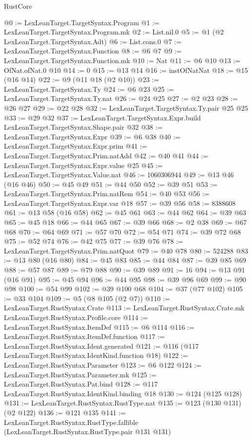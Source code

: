 \begin{lexlean}{RustCore}
\begin{coremodule}
@0 := LexLeanTarget.TargetSyntax.Program
@1 := LexLeanTarget.TargetSyntax.Program.mk
@2 := List.nil.{0}
@5 := @1 (@2 LexLeanTarget.TargetSyntax.Adt)
@6 := List.cons.{0}
@7 := LexLeanTarget.TargetSyntax.Function
@8 := @6 @7
@9 := LexLeanTarget.TargetSyntax.Function.mk
@10 := Nat
@11 := @6 @10
@13 := OfNat.ofNat.{0} @10
@14 := 0
@15 := @13 @14
@16 := instOfNatNat
@18 := @15 (@16 @14)
@22 := @9 (@11 @18 (@2 @10))
@23 := LexLeanTarget.TargetSyntax.Ty
@24 := @6 @23
@25 := LexLeanTarget.TargetSyntax.Ty.nat
@26 := @24 @25
@27 := @2 @23
@28 := @26 @27
@29 := @22 @28
@32 := LexLeanTarget.TargetSyntax.Ty.pair @25 @25
@33 := @29 @32
@37 := LexLeanTarget.TargetSyntax.Expr.build LexLeanTarget.TargetSyntax.Shape.pair @32
@38 := LexLeanTarget.TargetSyntax.Expr
@39 := @6 @38
@40 := LexLeanTarget.TargetSyntax.Expr.prim
@41 := LexLeanTarget.TargetSyntax.Prim.natAdd
@42 := @40 @41
@44 := LexLeanTarget.TargetSyntax.Expr.value @25
@45 := LexLeanTarget.TargetSyntax.Value.nat
@46 := 1060306944
@49 := @13 @46 (@16 @46)
@50 := @45 @49
@51 := @44 @50
@52 := @39 @51
@53 := LexLeanTarget.TargetSyntax.Prim.natRem
@54 := @40 @53
@56 := LexLeanTarget.TargetSyntax.Expr.var @18
@57 := @39 @56
@58 := 8388608
@61 := @13 @58 (@16 @58)
@62 := @45 @61
@63 := @44 @62
@64 := @39 @63
@65 := @45 @18
@66 := @44 @65
@67 := @39 @66
@68 := @2 @38
@69 := @67 @68
@70 := @64 @69
@71 := @57 @70
@72 := @54 @71
@74 := @39 @72 @68
@75 := @52 @74
@76 := @42 @75
@77 := @39 @76
@78 := LexLeanTarget.TargetSyntax.Prim.natQuot
@79 := @40 @78
@80 := 524288
@83 := @13 @80 (@16 @80)
@84 := @45 @83
@85 := @44 @84
@87 := @39 @85 @69
@88 := @57 @87
@89 := @79 @88
@90 := @39 @89
@91 := 16
@94 := @13 @91 (@16 @91)
@95 := @45 @94
@96 := @44 @95
@98 := @39 @96 @69
@99 := @90 @98
@100 := @54 @99
@102 := @39 @100 @68
@104 := @37 (@77 @102)
@105 := @33 @104
@109 := @5 (@8 @105 (@2 @7))
@110 := LexLeanTarget.RustSyntax.Crate
@113 := LexLeanTarget.RustSyntax.Crate.mk LexLeanTarget.RustSyntax.Profile.core
@114 := LexLeanTarget.RustSyntax.ItemDef
@115 := @6 @114
@116 := LexLeanTarget.RustSyntax.ItemDef.function
@117 := LexLeanTarget.RustSyntax.Ident.generated
@121 := @116 (@117 LexLeanTarget.RustSyntax.IdentKind.function @18)
@122 := LexLeanTarget.RustSyntax.Parameter
@123 := @6 @122
@124 := LexLeanTarget.RustSyntax.Parameter.mk
@125 := LexLeanTarget.RustSyntax.Pat.bind
@128 := @117 LexLeanTarget.RustSyntax.IdentKind.binding @18
@130 := @124 (@125 @128)
@131 := LexLeanTarget.RustSyntax.RustType.nat
@135 := @123 (@130 @131) (@2 @122)
@136 := @121 @135
@141 := LexLeanTarget.RustSyntax.RustType.fallible
    (LexLeanTarget.RustSyntax.RustType.pair @131 @131)

\end{coremodule}
\end{lexlean}
